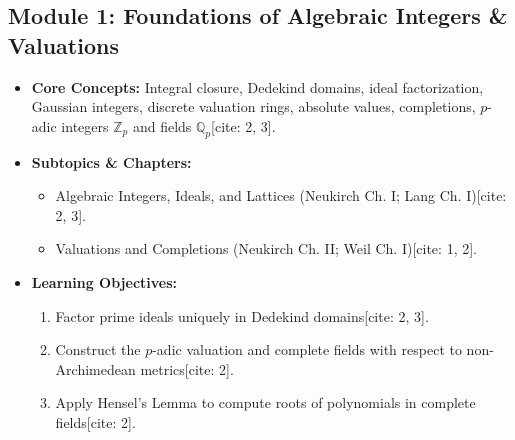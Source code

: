 \documentclass[11pt,a4paper]{article}
\begin{document}
\subsection*{Module 1: Foundations of Algebraic Integers \& Valuations}
\begin{itemize}[leftmargin=*]
    \item \textbf{Core Concepts:} Integral closure, Dedekind domains, ideal factorization, Gaussian integers, discrete valuation rings, absolute values, completions, $p$-adic integers $\mathbb{Z}_p$ and fields $\mathbb{Q}_p$[cite: 2, 3].
    \item \textbf{Subtopics \& Chapters:}
    \begin{itemize}
        \item Algebraic Integers, Ideals, and Lattices (Neukirch Ch. I; Lang Ch. I)[cite: 2, 3].
        \item Valuations and Completions (Neukirch Ch. II; Weil Ch. I)[cite: 1, 2].
    \end{itemize}
    \item \textbf{Learning Objectives:}
    \begin{enumerate}
        \item Factor prime ideals uniquely in Dedekind domains[cite: 2, 3].
        \item Construct the $p$-adic valuation and complete fields with respect to non-Archimedean metrics[cite: 2].
        \item Apply Hensel's Lemma to compute roots of polynomials in complete fields[cite: 2].
    \end{enumerate}
\end{itemize}
\end{document}
